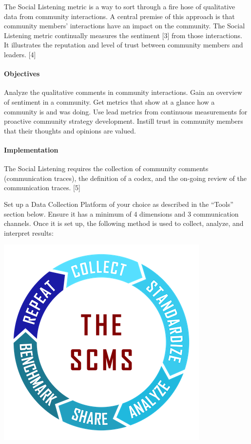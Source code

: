 The Social Listening metric is a way to sort through a fire hose of
qualitative data from community interactions. A central premise of this
approach is that community members' interactions have an impact on the
community. The Social Listening metric continually measures the
sentiment {[}3{]} from those interactions. It illustrates the reputation
and level of trust between community members and leaders. {[}4{]}

\hypertarget{objectives}{%
\paragraph{Objectives}\label{objectives}}

Analyze the qualitative comments in community interactions. Gain an
overview of sentiment in a community. Get metrics that show at a glance
how a community is and was doing. Use lead metrics from continuous
measurements for proactive community strategy development. Instill trust
in community members that their thoughts and opinions are valued.

\hypertarget{implementation}{%
\paragraph{Implementation}\label{implementation}}

The Social Listening requires the collection of community comments
(communication traces), the definition of a codex, and the on-going
review of the communication traces. {[}5{]}

Set up a Data Collection Platform of your choice as described in the
``Tools'' section below. Ensure it has a minimum of 4 dimensions and 3
communication channels. Once it is set up, the following method is used
to collect, analyze, and interpret results:

\includegraphics{images/social-listening_circle2.png}

